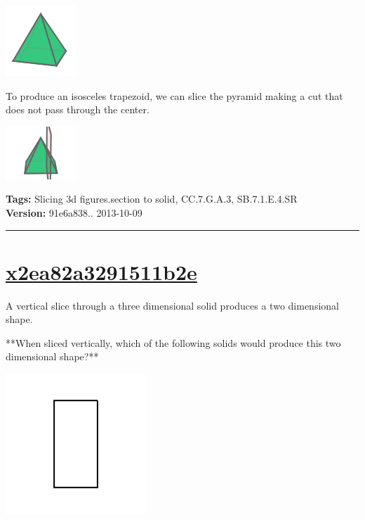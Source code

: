 \documentclass[twocolumn,10pt]{article}
\def\shrinkfactor{0.4}
\begin{document}
\includegraphics[scale=\shrinkfactor]{figures/49b99cca0c4e580ceaef3d4fd5842ea463191ce8.png}

To produce an isosceles trapezoid, we can slice the pyramid making a cut that does not pass through the center.


\includegraphics[scale=\shrinkfactor]{figures/5c4f5d18cffbd9888619838aea65c59f3f17f1d0.png}



\medskip
\noindent
\textbf{Tags:} {\footnotesize Slicing 3d figures.section to solid, CC.7.G.A.3, SB.7.1.E.4.SR}\\
\textbf{Version:} 91e6a838.. 2013-10-09
\smallskip\hrule





\section{\href{https://www.khanacademy.org/devadmin/content/items/x2ea82a3291511b2e}{x2ea82a3291511b2e}}

\noindent
A vertical slice through a three dimensional solid produces a two dimensional shape.

**When sliced vertically, which of the following solids would produce this two dimensional shape?**   

\includegraphics[scale=\shrinkfactor]{figures/7ccd247b0c79be3865322f7b79cbc84002ad5412.png} 
\end{document}
